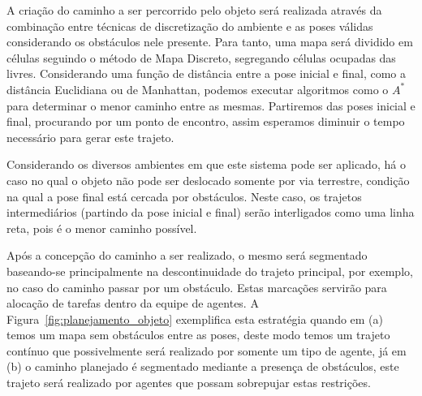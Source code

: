 A criação do caminho a ser percorrido pelo objeto será realizada através da combinação entre técnicas de discretização do ambiente e as poses válidas considerando os obstáculos nele presente.
Para tanto, uma mapa será dividido em células seguindo o método de Mapa Discreto, segregando células ocupadas das livres.
Considerando uma função de distância entre a pose inicial e final, como a distância Euclidiana ou de Manhattan, podemos executar algoritmos como o $A^{*}$ para determinar o menor caminho entre as mesmas.
Partiremos das poses inicial e final, procurando por um ponto de encontro, assim esperamos diminuir o tempo necessário para gerar este trajeto.

Considerando os diversos ambientes em que este sistema pode ser aplicado, há o caso no qual o objeto não pode ser deslocado somente por via terrestre, condição na qual a pose final está cercada por obstáculos. Neste caso, os trajetos intermediários (partindo da pose inicial e final) serão interligados como uma linha reta, pois é o menor caminho possível.

Após a concepção do caminho a ser realizado, o mesmo será segmentado baseando-se principalmente na descontinuidade do trajeto principal, por exemplo, no caso do caminho passar por um obstáculo. Estas marcações servirão para alocação de tarefas dentro da equipe de agentes. A Figura~\ref{fig:planejamento_objeto} exemplifica esta estratégia quando em (a) temos um mapa sem obstáculos entre as poses, deste modo temos um trajeto contínuo que possivelmente será realizado por somente um tipo de agente, já em (b) o caminho planejado é segmentado mediante a presença de obstáculos, este trajeto será realizado por agentes que possam sobrepujar estas restrições.

